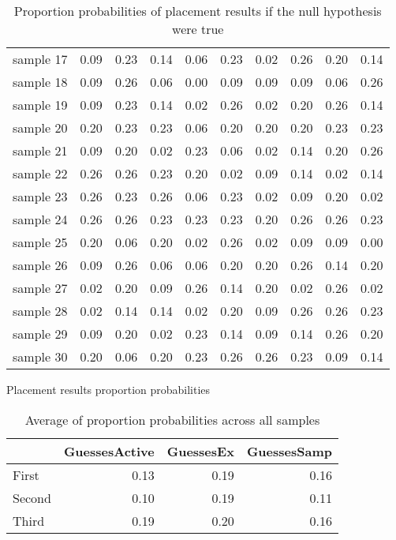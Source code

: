 \begin{table}
\begin{tabular}{lrrrrrrrrr}
sample 17 &          0.09 &  0.23 &  0.14 &      0.06 &  0.23 &  0.02 &        0.26 &  0.20 &  0.14 \\
sample 18 &          0.09 &  0.26 &  0.06 &      0.00 &  0.09 &  0.09 &        0.09 &  0.06 &  0.26 \\
sample 19 &          0.09 &  0.23 &  0.14 &      0.02 &  0.26 &  0.02 &        0.20 &  0.26 &  0.14 \\
sample 20 &          0.20 &  0.23 &  0.23 &      0.06 &  0.20 &  0.20 &        0.20 &  0.23 &  0.23 \\
sample 21 &          0.09 &  0.20 &  0.02 &      0.23 &  0.06 &  0.02 &        0.14 &  0.20 &  0.26 \\
sample 22 &          0.26 &  0.26 &  0.23 &      0.20 &  0.02 &  0.09 &        0.14 &  0.02 &  0.14 \\
sample 23 &          0.26 &  0.23 &  0.26 &      0.06 &  0.23 &  0.02 &        0.09 &  0.20 &  0.02 \\
sample 24 &          0.26 &  0.26 &  0.23 &      0.23 &  0.23 &  0.20 &        0.26 &  0.26 &  0.23 \\
sample 25 &          0.20 &  0.06 &  0.20 &      0.02 &  0.26 &  0.02 &        0.09 &  0.09 &  0.00 \\
sample 26 &          0.09 &  0.26 &  0.06 &      0.06 &  0.20 &  0.20 &        0.26 &  0.14 &  0.20 \\
sample 27 &          0.02 &  0.20 &  0.09 &      0.26 &  0.14 &  0.20 &        0.02 &  0.26 &  0.02 \\
sample 28 &          0.02 &  0.14 &  0.14 &      0.02 &  0.20 &  0.09 &        0.26 &  0.26 &  0.23 \\
sample 29 &          0.09 &  0.20 &  0.02 &      0.23 &  0.14 &  0.09 &        0.14 &  0.26 &  0.20 \\
sample 30 &          0.20 &  0.06 &  0.20 &      0.23 &  0.26 &  0.26 &        0.23 &  0.09 &  0.14 \\
\bottomrule
\end{tabular}
\caption{Placement results proportion probabilities}
\caption*{Proportion probabilities of placement results if the null hypothesis were true}
\end{table}


\begin{table}
\begin{tabular}{lrrr}
\toprule
{} &  GuessesActive &  GuessesEx &  GuessesSamp \\
\midrule
First  &        0.13 &       0.19 &         0.16 \\
Second &        0.10 &       0.19 &         0.11 \\
Third  &        0.19 &       0.20 &         0.16 \\
\bottomrule
\end{tabular}
\caption{Average of proportion probabilities across all samples}
\end{table}

